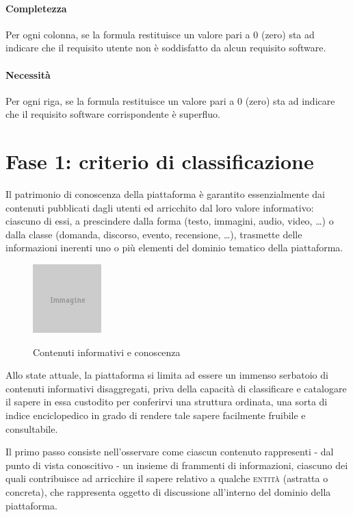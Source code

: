 \documentclass[11pt,a4paper,headsepline,hidelinks]{scrreprt} %
\begin{document}
	\paragraph{Completezza} Per ogni colonna, se la formula restituisce un valore pari a 0 (zero) sta ad indicare che il requisito utente non è soddisfatto da alcun requisito software.
	
	\paragraph{Necessità} Per ogni riga, se la formula restituisce un valore pari a 0 (zero) sta ad indicare che il requisito software corrispondente è superfluo.

	\section{Fase 1: criterio di classificazione}
	\label{sec:tesi:stage:fase-1}
	Il patrimonio di conoscenza della piattaforma è garantito essenzialmente dai contenuti pubblicati dagli utenti ed arricchito dal loro valore informativo: ciascuno di essi, a prescindere dalla forma (testo, immagini, audio, video, \ldots) o dalla classe (domanda, discorso, evento, recensione, \ldots), trasmette delle informazioni inerenti uno o più elementi del dominio tematico della piattaforma.
	
	\begin{figure}[ht]
     \begin{center}
       \includegraphics{placeholder.png}
       \label{fig:tesi:stage:classificazione:serbatoio-contenuti}
       \caption{Contenuti informativi e conoscenza}
     \end{center}
   \end{figure}
   
   Allo state attuale, la piattaforma si limita ad essere un immenso serbatoio di contenuti informativi disaggregati, priva della capacità di classificare e catalogare il sapere in essa custodito per conferirvi una struttura ordinata, una sorta di indice enciclopedico in grado di rendere tale sapere facilmente fruibile e consultabile.
  
  Il primo passo consiste nell'osservare come ciascun contenuto rappresenti - dal punto di vista conoscitivo - un insieme di frammenti di informazioni, ciascuno dei quali contribuisce ad arricchire il sapere relativo a qualche \textsc{entità} (astratta o concreta), che rappresenta oggetto di discussione all'interno del dominio della piattaforma.
  
\end{document}
